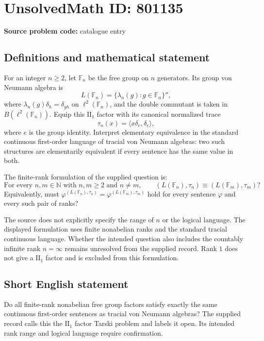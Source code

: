 \documentclass[11pt]{article}
\begin{document}
\section*{UnsolvedMath ID: 801135}
\textbf{Source problem code:} catalogue entry
\subsection{Definitions and mathematical statement}
For an integer \(n\geq 2\), let \(\mathbb{F}_n\) be the free group on \(n\) generators. Its group von Neumann algebra is
\[
L(\mathbb{F}_n)=\{\lambda_n(g):g\in\mathbb{F}_n\}'',
\]
where \(\lambda_n(g)\delta_h=\delta_{gh}\) on \(\ell^2(\mathbb{F}_n)\), and the double commutant is taken in \(B(\ell^2(\mathbb{F}_n))\). Equip this \(\mathrm{II}_1\) factor with its canonical normalized trace
\[
\tau_n(x)=\langle x\delta_e,\delta_e\rangle,
\]
where \(e\) is the group identity. Interpret elementary equivalence in the standard continuous first-order language of tracial von Neumann algebras: two such structures are elementarily equivalent if every sentence has the same value in both.

The finite-rank formulation of the supplied question is:
\[
\text{For every }n,m\in\mathbb{N}\text{ with }n,m\geq 2\text{ and }n\ne m,
\qquad
(L(\mathbb{F}_n),\tau_n)\equiv(L(\mathbb{F}_m),\tau_m)?
\]
Equivalently, must \(\varphi^{(L(\mathbb{F}_n),\tau_n)}=\varphi^{(L(\mathbb{F}_m),\tau_m)}\) hold for every sentence \(\varphi\) and every such pair of ranks?

The source does not explicitly specify the range of \(n\) or the logical language. The displayed formulation uses finite nonabelian ranks and the standard tracial continuous language. Whether the intended question also includes the countably infinite rank \(n=\infty\) remains unresolved from the supplied record. Rank \(1\) does not give a \(\mathrm{II}_1\) factor and is excluded from this formulation.
\subsection{Short English statement}
Do all finite-rank nonabelian free group factors satisfy exactly the same continuous first-order sentences as tracial von Neumann algebras? The supplied record calls this the \(\mathrm{II}_1\) factor Tarski problem and labels it open. Its intended rank range and logical language require confirmation.
\end{document}
